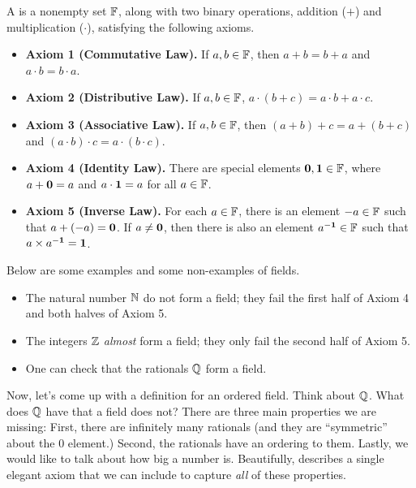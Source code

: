 \documentclass[11pt,twoside=off,numbers=noenddot]{scrbook}
\begin{document}
\begin{definition}[Fields]
  A  is a nonempty set $\mathbb F$, along with two binary
  operations, addition ($+$) and multiplication ($\cdot$), satisfying
  the following axioms.
  \begin{itemize}
    \item \textbf{Axiom 1 (Commutative Law).} If $a, b \in \mathbb F$, then
      $a + b = b + a$ and $a \cdot b = b \cdot a$.
    \item \textbf{Axiom 2 (Distributive Law).} If $a, b \in \mathbb F$, $a
      \cdot (b + c) = a \cdot b + a \cdot c$.
    \item \textbf{Axiom 3 (Associative Law).} If $a, b \in \mathbb F$, then
      $(a + b) + c = a + (b + c)$ and $(a \cdot b) \cdot c = a \cdot
      (b \cdot c)$.
    \item \textbf{Axiom 4 (Identity Law).} There are special elements
      $\textbf{0}, \textbf{1} \in \mathbb F$, where $a + \textbf{0} = a$ and $a \cdot \textbf{1}
      = a$ for all $a \in \mathbb F$.
    \item \textbf{Axiom 5 (Inverse Law).} For each $a \in \mathbb F$, there
      is an element $-a \in \mathbb F$ such that $a + (-a) = \textbf{0}$. If $a
      \neq \textbf{0}$, then there is also an element $a^{-\textbf{1}} \in \mathbb F$
      such that $a \times a^{-\textbf{1}} = \textbf{1}$.
  \end{itemize}
\end{definition}

\begin{example}
  Below are some examples and some non-examples of fields.
  \begin{itemize}
    \item The natural number $\mathbb N$ do not form a field; they fail the
      first half of Axiom 4 and both halves of Axiom 5.
    \item The integers $\mathbb Z$ \textit{almost} form a field; they only
      fail the second half of Axiom 5.
    \item One can check that the rationals $\mathbb Q$ form a field.
  \end{itemize}
\end{example}

\begin{remark}
  Now, let's come up with a definition for an ordered field. Think
  about $\mathbb Q$. What does $\mathbb Q$ have that a field does not? There are
  three main properties we are missing: First, there are infinitely
  many rationals (and they are ``symmetric'' about the 0 element.)
  Second, the rationals have an ordering to them. Lastly, we would
  like to talk about how big a number is. Beautifully,
   describes a single elegant axiom that we
  can include to capture \textit{all} of these properties.
\end{remark}
\end{document}
